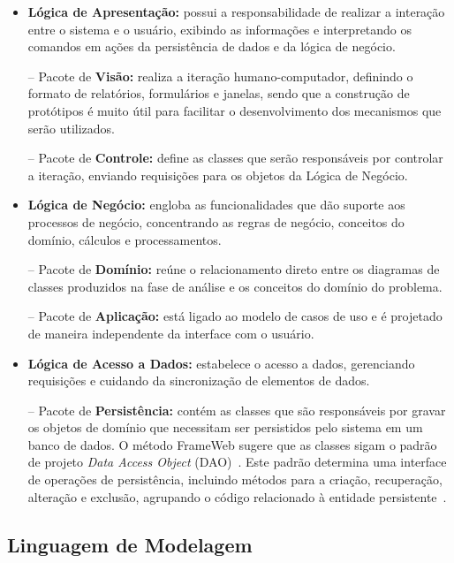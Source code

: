 \begin{itemize}

	\item \textbf{Lógica de Apresentação:} possui a responsabilidade de realizar a interação entre o sistema e o usuário, exibindo as informações e interpretando os comandos em ações da persistência de dados e da lógica de negócio.
		
		\subitem -- Pacote de \textbf{Visão:} realiza a iteração humano-computador, definindo o formato de relatórios, formulários e janelas, sendo que a construção de protótipos é muito útil para facilitar o desenvolvimento dos mecanismos que serão utilizados. 
		
		\subitem -- Pacote de \textbf{Controle:} define as classes que serão responsáveis por controlar a iteração, enviando requisições para os objetos da Lógica de Negócio.  
	
	\item \textbf{Lógica de Negócio:} engloba as funcionalidades que dão suporte aos processos de negócio, concentrando as regras de negócio, conceitos do domínio, cálculos e processamentos.
	
		\subitem -- Pacote de \textbf{Domínio:} reúne o relacionamento direto entre os diagramas de classes produzidos na fase de análise e os conceitos do domínio do problema. 
		
		\subitem -- Pacote de \textbf{Aplicação:} está ligado ao modelo de casos de uso e é projetado de maneira independente da interface com o usuário.
	
	\item \textbf{Lógica de Acesso a Dados:} estabelece o acesso a dados, gerenciando requisições e cuidando da sincronização de elementos de dados.
	
		\subitem -- Pacote de \textbf{Persistência:} contém as classes que são responsáveis por gravar os objetos de domínio que necessitam ser persistidos pelo sistema em um banco de dados. O método FrameWeb sugere que as classes sigam o padrão de projeto \textit{Data Access Object} (DAO)~\cite{alur-et-al:bpds03}. Este padrão determina uma interface de operações de persistência, incluindo métodos para a criação, recuperação, alteração e exclusão, agrupando o código relacionado à entidade persistente~\cite{bauer-et-al:jpwh07}. 

\end{itemize}

\subsection{Linguagem de Modelagem}
\label{sec-ref-linguagem-modelagem}

